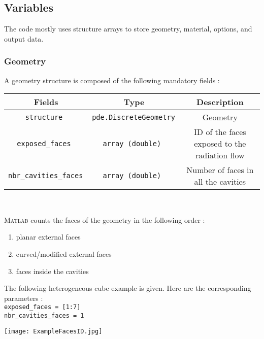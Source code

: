 \subsection{Variables}

The code mostly uses structure arrays to store geometry, material, options, and output data. \\

\subsubsection{Geometry}

A geometry structure is composed of the following mandatory fields : 

\renewcommand{\arraystretch}{1.5}
\begin{table}[h]
    \centering
    \begin{tabular}{|>{\customfont}c|>{\customfont}c|>{\customfont}c|}
        \hline 
        \rowcolor{gray!30}
        \textbf{Fields} & \textbf{Type} & \textbf{Description} \\ \hline
        \tt structure & \tt pde.DiscreteGeometry & Geometry \\ \hline 
        \tt exposed\_faces & \tt array (double) & ID of the faces exposed to the radiation flow \\ \hline 
        \tt nbr\_cavities\_faces	& \tt array (double) & Number of faces in all the cavities \\ \hline 
    \end{tabular}
\end{table}
\ 

\begin{minipage}{8.5cm}
\textsc{Matlab} counts the faces of the geometry in the following order :
\begin{enumerate}
    \item planar external faces
    \item curved/modified external faces
    \item faces inside the cavities
\end{enumerate} 

The following heterogeneous cube example is given. Here are the corresponding parameters : \\

{\tt exposed\_faces = [1:7]}\\
{\tt nbr\_cavities\_faces = 1}\\

\end{minipage}\hfill\begin{minipage}{7cm}
\begin{center}
    \texttt{[image: ExampleFacesID.jpg]}
\end{center}    
\end{minipage}
\ 


